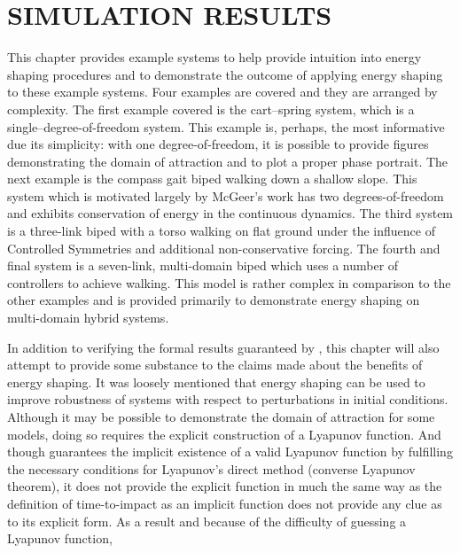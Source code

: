 \chapter{\uppercase{Simulation Results}} \label{chap:simulations}

This chapter provides example systems to help provide intuition into energy
shaping procedures and to demonstrate the outcome of applying energy shaping to
these example systems.
%
Four examples are covered and they are arranged by complexity.
%
The first example covered is the cart--spring system, which is a
single--degree-of-freedom system.
%
This example is, perhaps, the most informative due its simplicity:
%
with one degree-of-freedom, it is possible to provide figures demonstrating the
domain of attraction and to plot a proper phase portrait.
%
The next example is the compass gait biped walking down a shallow slope.
%
This system which is motivated largely by McGeer's work \cite{McGeer1990} has
two degrees-of-freedom and exhibits conservation of energy in the continuous
dynamics.
%
The third system is a three-link biped with a torso walking on flat ground under
the influence of Controlled Symmetries \cite{Spong2005} and additional
non-conservative forcing.
%
The fourth and final system is a seven-link, multi-domain biped which uses a
number of controllers to achieve walking.
%
This model is rather complex in comparison to the other examples and is provided
primarily to demonstrate energy shaping on multi-domain hybrid systems.

In addition to verifying the formal results guaranteed by
, this chapter will also attempt to provide some
substance to the claims made about the benefits of energy shaping.
%
It was loosely mentioned that energy shaping can be used to improve robustness
of systems with respect to perturbations in initial conditions.
%
Although it may be possible to demonstrate the domain of attraction for some
models, doing so requires the explicit construction of a Lyapunov function.
%
And though  guarantees the implicit existence of a
valid Lyapunov function by fulfilling the necessary conditions for Lyapunov's
direct method (converse Lyapunov theorem), it does not provide the explicit
function in much the same way as the definition of time-to-impact as an implicit
function does not provide any clue as to its explicit form.
%
As a result and because of the difficulty of guessing a Lyapunov function, 




